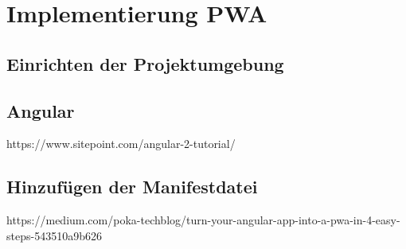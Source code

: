 \newpage
\section{Implementierung PWA}

\subsection{Einrichten der Projektumgebung}
\subsection{Angular}

https://www.sitepoint.com/angular-2-tutorial/
\subsection{Hinzufügen der Manifestdatei}
https://medium.com/poka-techblog/turn-your-angular-app-into-a-pwa-in-4-easy-steps-543510a9b626